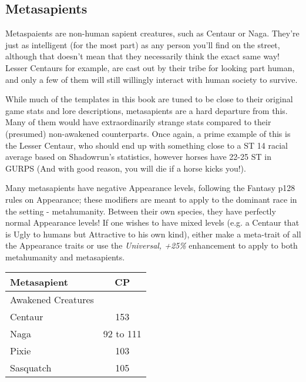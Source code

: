 \begin{multicols*}{3}
	\subsection{Metasapients}
	
	Metaspaients are non-human sapient creatures, such as Centaur or Naga. They're just as intelligent (for the most part) as any person you'll find on the street, although that doesn't mean that they necessarily think the exact same way! Lesser Centaurs for example, are cast out by their tribe for looking part human, and only a few of them will still willingly interact with human society to survive.
	
	While much of the templates in this book are tuned to be close to their original game stats and lore descriptions, metasapients are a hard departure from this. Many of them would have extraordinarily strange stats compared to their (presumed) non-awakened counterparts. Once again, a prime example of this is the Lesser Centaur, who should end up with something close to a ST 14 racial average based on Shadowrun's statistics, however horses have 22-25 ST in GURPS (And with good reason, you will die if a horse kicks you!).
	
	Many metasapients have negative Appearance levels, following the Fantasy p128  rules on Appearance; these modifiers are meant to apply to the dominant race in the setting - metahumanity. Between their own species, they have perfectly normal Appearance levels! If one wishes to have mixed levels (e.g. a Centaur that is Ugly to humans but Attractive to his own kind), either make a meta-trait of all the Appearance traits or use the \textit{Universal, +25\%} enhancement to apply to both metahumanity and metasapients.
	
	\begin{center}
		\begin{tabularx}{0.32\textwidth}{|X|c|}
			\hline
			Metasapient & CP \\
			\hline
			\hline
			Awakened Creatures & \\
			\hline
			Centaur & 153 \\
			Naga & 92 to 111 \\
			Pixie & 103 \\
			Sasquatch & 105 \\
			\hline
		\end{tabularx}
	\end{center}
	

\end{multicols*}
